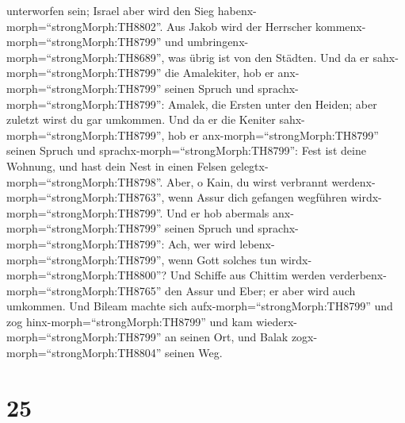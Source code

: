unterworfen sein; Israel aber wird den Sieg
habenx-morph=``strongMorph:TH8802''.  Aus Jakob wird der
Herrscher kommenx-morph=``strongMorph:TH8799'' und
umbringenx-morph=``strongMorph:TH8689'', was übrig ist von den Städten.
 Und da er sahx-morph=``strongMorph:TH8799'' die
Amalekiter, hob er anx-morph=``strongMorph:TH8799'' seinen Spruch und
sprachx-morph=``strongMorph:TH8799'': Amalek, die Ersten unter den
Heiden; aber zuletzt wirst du gar umkommen.  Und da er die
Keniter sahx-morph=``strongMorph:TH8799'', hob er
anx-morph=``strongMorph:TH8799'' seinen Spruch und
sprachx-morph=``strongMorph:TH8799'': Fest ist deine Wohnung, und hast
dein Nest in einen Felsen gelegtx-morph=``strongMorph:TH8798''.
 Aber, o Kain, du wirst verbrannt
werdenx-morph=``strongMorph:TH8763'', wenn Assur dich gefangen wegführen
wirdx-morph=``strongMorph:TH8799''.  Und er hob abermals
anx-morph=``strongMorph:TH8799'' seinen Spruch und
sprachx-morph=``strongMorph:TH8799'': Ach, wer wird
lebenx-morph=``strongMorph:TH8799'', wenn Gott solches tun
wirdx-morph=``strongMorph:TH8800''?  Und Schiffe aus
Chittim werden verderbenx-morph=``strongMorph:TH8765'' den Assur und
Eber; er aber wird auch umkommen.  Und Bileam machte sich
aufx-morph=``strongMorph:TH8799'' und zog
hinx-morph=``strongMorph:TH8799'' und kam
wiederx-morph=``strongMorph:TH8799'' an seinen Ort, und Balak
zogx-morph=``strongMorph:TH8804'' seinen Weg.

\hypertarget{section-24}{%
\section{25}\label{section-24}}

